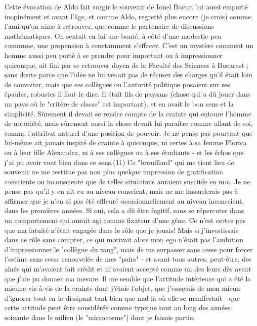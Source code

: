 {Cette évocation de Aldo fait surgir le souvenir de Ionel Bucur, lui aussi emporté inopinément et avant l'âge, et comme Aldo, regretté plus encore (je crois) comme l'ami qu'on aime à retrouver, que comme le partenaire de discussions mathématiques. On sentait en lui une bonté, à côté d'une modestie peu commune, une propension à constamment s'effacer. C'est un mystère comment un homme aussi peu porté à se prendre pour important ou à impressionner quiconque, ait fini par se retrouver doyen de la Faculté des Sciences à Bucarest ; sans doute parce que l'idée ne lui venait pas de récuser des charges qu'il était loin de convoiter, mais que ses collègues ou l'autorité politique posaient sur ses épaules, robustes il faut le dire. Il était fils de paysans (chose qui a dû jouer dans un pays où le "critère de classe" est important), et en avait le bon sens et la simplicité. Sûrement il devait se rendre compte de la crainte qui entoure l'homme de notoriété, mais sûrement aussi la chose devait lui paraître comme allant de soi, comme l'attribut naturel d'une position de pouvoir. Je ne pense pas pourtant que lui-même ait jamais inspiré de crainte à quiconque, ni certes à sa femme Florica ou à leur fille Alexandra, ni à ses collègues ou à ses étudiants - et les échos que j'ai pu avoir vont bien dans ce sens.}(11) Ce "brouillard" qui me tient lieu de souvenir ne me restitue pas non plus quelque impression de gratification consciente ou inconsciente que de telles situations auraient suscitée en moi. Je ne pense pas qu'il y en ait eu au niveau conscient, mais ne me hasarderais pas à affirmer que je n'en ai pas été effleuré occasionnellement au niveau inconscient, dans les premières années. Si oui, cela a dû être fugitif, sans se répercuter dans un comportement qui aurait agi comme fixateur d'une gêne. Ce n'est certes pas que ma fatuité n'était engagée dans le rôle que je jouais! Mais si j'investissais dans ce rôle sans compter, ce qui motivait alors mon ego n'était pas l'ambition d'impressionner le "collègue du rang", mais de me surpasser sans cesse pour forcer l'estime sans cesse renouvelée de mes "pairs" - et avant tous autres, peut-être, des aînés qui m'avaient fait crédit et m'avaient accepté comme un des leurs dès avant que j'aie pu donner ma mesure. Il me semble que l'attitude intérieure qui a été la mienne vis-à-vis de la crainte dont j'étais l'objet, que j'essayais de mon mieux d'ignorer tout en la dissipant tant bien que mal là où elle se manifestait - que cette attitude peut être considérée comme typique tout au long des années soixante dans le milieu (le "microcosme") dont je faisais partie.

